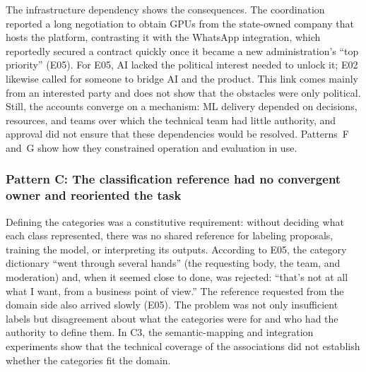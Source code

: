 \documentclass[sigconf,nonacm]{acmart}
\begin{document}
The infrastructure dependency shows the consequences. The coordination reported a long negotiation to obtain GPUs from the state-owned company that hosts the platform, contrasting it with the WhatsApp integration, which reportedly secured a contract quickly once it became a new administration's ``top priority'' (E05). For E05, AI lacked the political interest needed to unlock it; E02 likewise called for someone to bridge AI and the product. This link comes mainly from an interested party and does not show that the obstacles were only political. Still, the accounts converge on a mechanism: ML delivery depended on decisions, resources, and teams over which the technical team had little authority, and approval did not ensure that these dependencies would be resolved. Patterns~F and~G show how they constrained operation and evaluation in use.


\subsubsection{Pattern C: The classification reference had no convergent owner and reoriented the task}
\label{sec:pc}

Defining the categories was a constitutive requirement: without deciding what each class represented, there was no shared reference for labeling proposals, training the model, or interpreting its outputs. According to E05, the category dictionary ``went through several hands'' (the requesting body, the team, and moderation) and, when it seemed close to done, was rejected: ``that's not at all what I want, from a business point of view.'' The reference requested from the domain side also arrived slowly (E05). The problem was not only insufficient labels but disagreement about what the categories were for and who had the authority to define them. In C3, the semantic-mapping and integration experiments show that the technical coverage of the associations did not establish whether the categories fit the domain.
\end{document}
